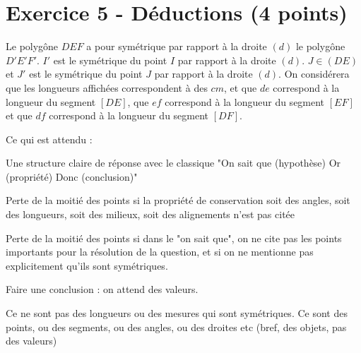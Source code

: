 \documentclass[answers]{exam}
\begin{document}
\section*{Exercice 5 - Déductions (4 points)}

\begin{questions}
  \question[4] Le polygône $DEF$ a pour symétrique par rapport à la droite $(d)$ le polygône $D'E'F'$. $I'$ est le symétrique du point $I$ par rapport à la droite $(d)$. $J \in (DE)$ et $J'$ est le symétrique du point $J$ par rapport à la droite $(d)$. On considérera que les longueurs affichées correspondent à des $cm$, et que $de$ correspond à la longueur du segment $[DE]$,
  que $ef$ correspond à la longueur du segment $[EF]$ 
  et que $df$ correspond à la longueur du segment $[DF]$.
  \begin{Indication}

Ce qui est attendu : 
\begin{compactitem}
\item Une structure claire de réponse avec le classique "On sait que (hypothèse) Or (propriété) Donc (conclusion)"
\item Perte de la moitié des points si la propriété de conservation soit des angles, soit des longueurs, soit des milieux, soit des alignements n'est pas citée
\item Perte de la moitié des points si dans le "on sait que", on ne cite pas les points importants pour la résolution de la question, et si on ne mentionne pas explicitement qu'ils sont symétriques.
\item Faire une conclusion : on attend des valeurs.
\item Ce ne sont pas des longueurs ou des mesures qui sont symétriques. Ce sont des points, ou des segments, ou des angles, ou des droites etc (bref, des objets, pas des valeurs)
\end{compactitem}

\end{Indication}
\end{questions}
\end{document}
